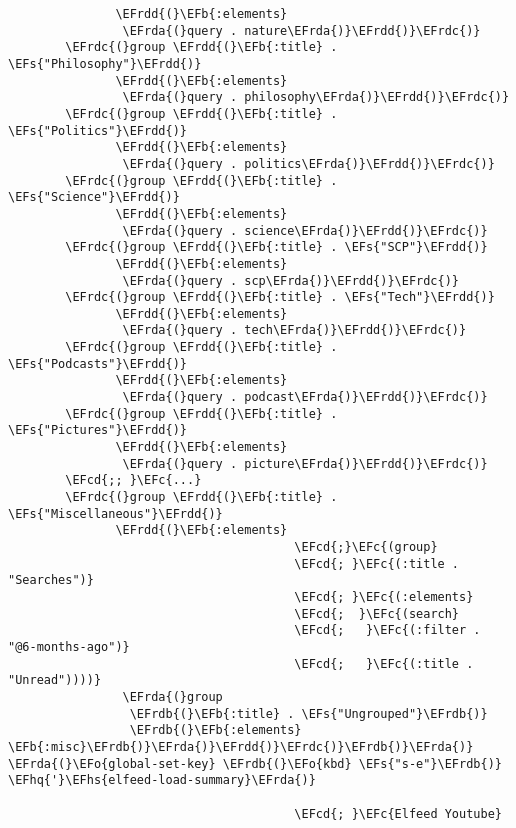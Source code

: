 \documentclass[a4wide,10pt]{article}
\newcommand{\EFc}[1]{\textcolor{EFc}{#1}} %
\newcommand{\EFcd}[1]{\textcolor{EFcd}{#1}} %
\newcommand{\EFs}[1]{\textcolor{EFs}{#1}} %
\newcommand{\EFb}[1]{\textcolor{EFb}{#1}} %
\newcommand{\EFo}[1]{\textcolor{EFo}{#1}} %
\newcommand{\EFhq}[1]{\textcolor{EFhq}{#1}} %
\newcommand{\EFhs}[1]{\textcolor{EFhs}{#1}} %
\newcommand{\EFrda}[1]{\textcolor{EFrda}{#1}} %
\newcommand{\EFrdb}[1]{\textcolor{EFrdb}{#1}} %
\newcommand{\EFrdc}[1]{\textcolor{EFrdc}{#1}} %
\newcommand{\EFrdd}[1]{\textcolor{EFrdd}{#1}} %
\begin{document}
\begin{Code}
\begin{Verbatim}
               \EFrdd{(}\EFb{:elements}
                \EFrda{(}query . nature\EFrda{)}\EFrdd{)}\EFrdc{)}
        \EFrdc{(}group \EFrdd{(}\EFb{:title} . \EFs{"Philosophy"}\EFrdd{)}
               \EFrdd{(}\EFb{:elements}
                \EFrda{(}query . philosophy\EFrda{)}\EFrdd{)}\EFrdc{)}
        \EFrdc{(}group \EFrdd{(}\EFb{:title} . \EFs{"Politics"}\EFrdd{)}
               \EFrdd{(}\EFb{:elements}
                \EFrda{(}query . politics\EFrda{)}\EFrdd{)}\EFrdc{)}
        \EFrdc{(}group \EFrdd{(}\EFb{:title} . \EFs{"Science"}\EFrdd{)}
               \EFrdd{(}\EFb{:elements}
                \EFrda{(}query . science\EFrda{)}\EFrdd{)}\EFrdc{)}
        \EFrdc{(}group \EFrdd{(}\EFb{:title} . \EFs{"SCP"}\EFrdd{)}
               \EFrdd{(}\EFb{:elements}
                \EFrda{(}query . scp\EFrda{)}\EFrdd{)}\EFrdc{)}
        \EFrdc{(}group \EFrdd{(}\EFb{:title} . \EFs{"Tech"}\EFrdd{)}
               \EFrdd{(}\EFb{:elements}
                \EFrda{(}query . tech\EFrda{)}\EFrdd{)}\EFrdc{)}
        \EFrdc{(}group \EFrdd{(}\EFb{:title} . \EFs{"Podcasts"}\EFrdd{)}
               \EFrdd{(}\EFb{:elements}
                \EFrda{(}query . podcast\EFrda{)}\EFrdd{)}\EFrdc{)}
        \EFrdc{(}group \EFrdd{(}\EFb{:title} . \EFs{"Pictures"}\EFrdd{)}
               \EFrdd{(}\EFb{:elements}
                \EFrda{(}query . picture\EFrda{)}\EFrdd{)}\EFrdc{)}
        \EFcd{;; }\EFc{...}
        \EFrdc{(}group \EFrdd{(}\EFb{:title} . \EFs{"Miscellaneous"}\EFrdd{)}
               \EFrdd{(}\EFb{:elements}
                                        \EFcd{;}\EFc{(group}
                                        \EFcd{; }\EFc{(:title . "Searches")}
                                        \EFcd{; }\EFc{(:elements}
                                        \EFcd{;  }\EFc{(search}
                                        \EFcd{;   }\EFc{(:filter . "@6-months-ago")}
                                        \EFcd{;   }\EFc{(:title . "Unread"))))}
                \EFrda{(}group
                 \EFrdb{(}\EFb{:title} . \EFs{"Ungrouped"}\EFrdb{)}
                 \EFrdb{(}\EFb{:elements} \EFb{:misc}\EFrdb{)}\EFrda{)}\EFrdd{)}\EFrdc{)}\EFrdb{)}\EFrda{)}
\EFrda{(}\EFo{global-set-key} \EFrdb{(}\EFo{kbd} \EFs{"s-e"}\EFrdb{)} \EFhq{'}\EFhs{elfeed-load-summary}\EFrda{)}

                                        \EFcd{; }\EFc{Elfeed Youtube}


\end{Verbatim}
\end{Code}
\end{document}
